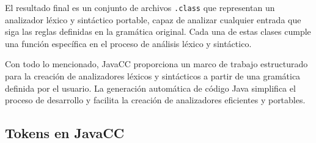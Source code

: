 El resultado final es un conjunto de archivos \lstinline|.class| que representan un analizador léxico y sintáctico portable, capaz de analizar cualquier entrada que siga las reglas definidas en la gramática original. %
Cada una de estas clases cumple una función específica en el proceso de análisis léxico y sintáctico.

Con todo lo mencionado, JavaCC proporciona un marco de trabajo estructurado para la creación de analizadores léxicos y sintácticos a partir de una gramática definida por el usuario. La generación automática de código Java simplifica el proceso de desarrollo y facilita la creación de analizadores eficientes y portables.

\subsection{Tokens en JavaCC}
\label{sec:tokensenjavacc}








